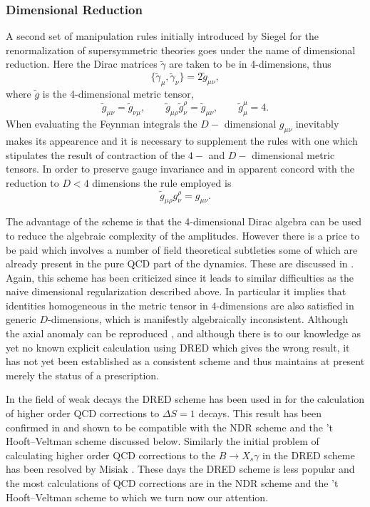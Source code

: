 \documentclass[12pt]{article}
\def\gat{\tilde{\gamma}}
\def\gt{\tilde{g}}
\newcommand{\be}{\begin{equation}}
\newcommand{\ee}{\end{equation}}
\begin{document}
\begin{itemize}
 \subsubsection{Dimensional Reduction}
 A second set of manipulation rules initially introduced by Siegel
 \cite{Si} for the renormalization of supersymmetric theories goes under
 the name of dimensional reduction. Here the Dirac matrices $\gat$ are taken
 to be in 4-dimensions, thus
\be\label{BW4}
 \{ \gat_{\mu} , \gat_{\nu} \} = 2 \gt_{\mu \nu},
\ee
 where $\gt$ is the 4-dimensional metric tensor,
\be\label{BW5}
 \gt_{\mu \nu} = \gt_{\nu \mu}, \qquad
 \gt_{\mu \rho} \gt^{\rho}_{\nu} = \gt_{\mu \nu}, \qquad
 \gt_{\mu}^{\mu} = 4.
\ee
 When evaluating the Feynman integrals the $D-$ dimensional
 $ g_{\mu\nu} $ inevitably makes
 its appearence and it is necessary to supplement the rules with one which
 stipulates the result of contraction of the $4-$ and $D-$ dimensional
 metric tensors. In order to preserve gauge invariance and in apparent concord
 with the reduction to $D<4$ dimensions the rule employed is
\be\label{BW6}
 \gt_{\mu \rho} g^{\rho}_{\nu} = g_{\mu \nu}.
\ee
 
 The advantage of the scheme is that the 4-dimensional Dirac algebra can be
 used to reduce the algebraic complexity of the amplitudes. However there is
 a price to be paid which involves a number of field theoretical subtleties
  some of which are already present in the pure QCD part of the dynamics.
 These are discussed in \cite{ACMP}.
 Again, this scheme has been criticized \cite{Bo,Ma} since it leads
 to similar
 difficulties as the naive dimensional regularization described above.
 In particular it implies that identities homogeneous in the metric tensor in
 $4$-dimensions are also satisfied in generic $D$-dimensions, which is
 manifestly algebraically inconsistent. Although
 the axial anomaly can be reproduced \cite{NT}, and although
 there is to our knowledge as yet no known explicit calculation using
 DRED which gives the wrong result, it
 has not yet been established as a consistent scheme and thus
 maintains at present merely the status of a prescription.

 In the field of weak decays the DRED scheme has been used in \cite{ACMP} 
for the calculation of higher order QCD corrections to $\Delta S=1$
decays.
This result has been confirmed in \cite{WEISZ} and shown to be compatible
with the NDR scheme and the 't Hooft--Veltman scheme discussed below.
Similarly the initial problem of calculating higher order QCD corrections
to the $B\to X_s\gamma$ in the DRED scheme \cite{CAND} has been
resolved by Misiak \cite{MISD}. 
These days the DRED scheme is less popular and the
most calculations of QCD corrections are in the NDR scheme and the
't Hooft--Veltman scheme to which we turn now our attention.

\end{itemize}
\end{document}
